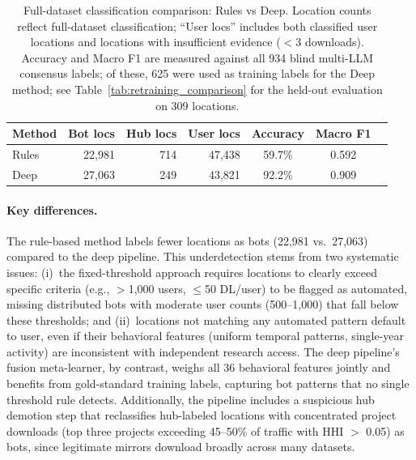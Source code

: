 \documentclass[11pt,a4paper]{article}
\begin{document}
\begin{table}[H]
\centering
\caption{Full-dataset classification comparison: Rules vs Deep. Location counts reflect full-dataset classification; ``User locs'' includes both classified user locations and locations with insufficient evidence ($<$3 downloads). Accuracy and Macro F1 are measured against all 934 blind multi-LLM consensus labels; of these, 625 were used as training labels for the Deep method; see Table~\ref{tab:retraining_comparison} for the held-out evaluation on 309 locations.}
\label{tab:rules_vs_deep_full}
\small
\begin{tabular}{lrrrccc}
\toprule
\textbf{Method} & \textbf{Bot locs} & \textbf{Hub locs} & \textbf{User locs} & \textbf{Accuracy} & \textbf{Macro F1} \\
\midrule
Rules & 22,981 & 714  & 47,438 & 59.7\% & 0.592 \\
Deep  & 27,063 & 249  & 43,821 & 92.2\% & 0.909 \\
\bottomrule
\end{tabular}
\end{table}

\paragraph{Key differences.}
The rule-based method labels fewer locations as bots (22,981 vs.\ 27,063) compared to the deep pipeline. This underdetection stems from two systematic issues: (i)~the fixed-threshold approach requires locations to clearly exceed specific criteria (e.g., $>$1,000 users, $\leq$50 DL/user) to be flagged as automated, missing distributed bots with moderate user counts (500--1,000) that fall below these thresholds; and (ii)~locations not matching any automated pattern default to user, even if their behavioral features (uniform temporal patterns, single-year activity) are inconsistent with independent research access. The deep pipeline's fusion meta-learner, by contrast, weighs all 36 behavioral features jointly and benefits from gold-standard training labels, capturing bot patterns that no single threshold rule detects. Additionally, the pipeline includes a suspicious hub demotion step that reclassifies hub-labeled locations with concentrated project downloads (top three projects exceeding 45--50\% of traffic with HHI $>$ 0.05) as bots, since legitimate mirrors download broadly across many datasets.
\end{document}
